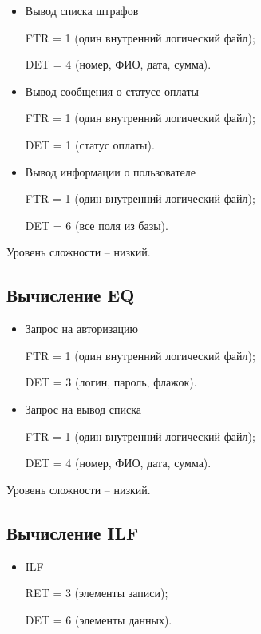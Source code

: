 \begin{itemize}[label = ---]
    \item Вывод списка штрафов
    
    FTR = 1 (один внутренний логический файл);
    
    DET = 4 (номер, ФИО, дата, сумма).
    
    \item Вывод сообщения о статусе оплаты
    
    FTR = 1 (один внутренний логический файл);
    
    DET = 1 (статус оплаты).
    
    \item Вывод информации о пользователе
    
    FTR = 1 (один внутренний логический файл);
    
    DET = 6 (все поля из базы).

\end{itemize}

Уровень сложности – низкий.

\subsection*{Вычисление EQ}

\begin{itemize}[label = ---]
    \item Запрос на авторизацию
    
    FTR = 1 (один внутренний логический файл);
    
    DET = 3 (логин, пароль, флажок).
    
    \item Запрос на вывод списка
    
    FTR = 1 (один внутренний логический файл);
    
    DET = 4 (номер, ФИО, дата, сумма).
\end{itemize}

Уровень сложности – низкий.

\subsection*{Вычисление ILF}

\begin{itemize}[label = ---]
    \item ILF
    
    RET = 3 (элементы записи);
    
    DET = 6 (элементы данных).
\end{itemize}

